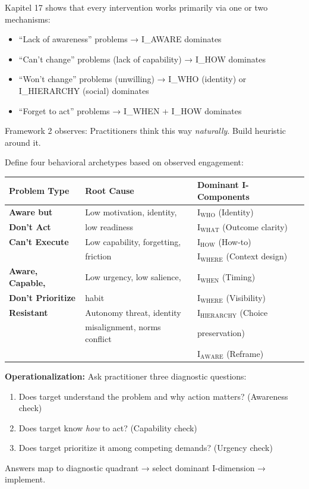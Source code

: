 Kapitel 17 shows that every intervention works primarily via one or two mechanisms:
\begin{itemize}[nosep]
\item ``Lack of awareness'' problems → I\_AWARE dominates
\item ``Can't change'' problems (lack of capability) → I\_HOW dominates
\item ``Won't change'' problems (unwilling) → I\_WHO (identity) or I\_HIERARCHY (social) dominates
\item ``Forget to act'' problems → I\_WHEN + I\_HOW dominates
\end{itemize}

Framework 2 observes: Practitioners think this way \textit{naturally}. Build heuristic around it.

\begin{definition}

Define four behavioral archetypes based on observed engagement:

\begin{center}
\begin{tabular}{@{}lll@{}}
\toprule
\textbf{Problem Type} & \textbf{Root Cause} & \textbf{Dominant I-Components} \\
\midrule
\textbf{Aware but} & Low motivation, identity, & I$_{\text{WHO}}$ (Identity) \\
\textbf{Don't Act} & low readiness & I$_{\text{WHAT}}$ (Outcome clarity) \\
\midrule
\textbf{Can't Execute} & Low capability, forgetting, & I$_{\text{HOW}}$ (How-to) \\
& friction & I$_{\text{WHERE}}$ (Context design) \\
\midrule
\textbf{Aware, Capable,} & Low urgency, low salience, & I$_{\text{WHEN}}$ (Timing) \\
\textbf{Don't Prioritize} & habit & I$_{\text{WHERE}}$ (Visibility) \\
\midrule
\textbf{Resistant} & Autonomy threat, identity & I$_{\text{HIERARCHY}}$ (Choice \\
& misalignment, norms conflict & preservation) \\
& & I$_{\text{AWARE}}$ (Reframe) \\
\bottomrule
\end{tabular}
\end{center}

\textbf{Operationalization:} Ask practitioner three diagnostic questions:

\begin{enumerate}[nosep]
\item Does target understand the problem and why action matters? (Awareness check)
\item Does target know \textit{how} to act? (Capability check)
\item Does target prioritize it among competing demands? (Urgency check)
\end{enumerate}

Answers map to diagnostic quadrant → select dominant I-dimension → implement.

\end{definition}


